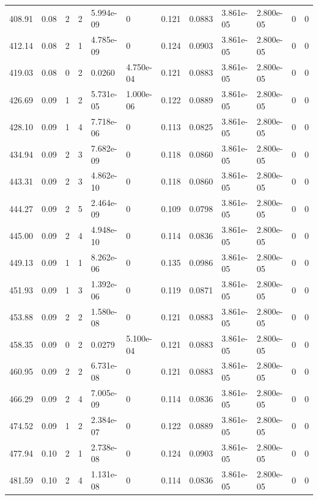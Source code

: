 \documentclass[preview]{standalone}
\begin{document}
{{{{\begin{tabular}{L{1.2cm}C{1.2cm} C{0.3cm}C{0.5cm} C{1.4cm}C{1.4cm} C{1.4cm}C{1.4cm} C{1.6cm}C{1.6cm} C{1.6cm}C{1.6cm}}
  408.91  &  0.08  & 2     &  2 &  5.994e-09  & 0  &  0.121&   0.0883& 3.861e-05 & 2.800e-05   &  0 & 0  \\ 
  412.14  &  0.08  & 2     &  1 &  4.785e-09  & 0  &  0.124&   0.0903& 3.861e-05 & 2.800e-05   &  0 & 0  \\ 
  419.03  &  0.08  & 0     &  2 &  0.0260  & 4.750e-04  &  0.121&   0.0883& 3.861e-05 & 2.800e-05   &  0 & 0  \\ 
  426.69  &  0.09  & 1     &  2 &  5.731e-05  & 1.000e-06  &  0.122&   0.0889& 3.861e-05 & 2.800e-05   &  0 & 0  \\ 
  428.10  &  0.09  & 1     &  4 &  7.718e-06  & 0  &  0.113&   0.0825& 3.861e-05 & 2.800e-05   &  0 & 0  \\ 
  434.94  &  0.09  & 2     &  3 &  7.682e-09  & 0  &  0.118&   0.0860& 3.861e-05 & 2.800e-05   &  0 & 0  \\ 
  443.31  &  0.09  & 2     &  3 &  4.862e-10  & 0  &  0.118&   0.0860& 3.861e-05 & 2.800e-05   &  0 & 0  \\ 
  444.27  &  0.09  & 2     &  5 &  2.464e-09  & 0  &  0.109&   0.0798& 3.861e-05 & 2.800e-05   &  0 & 0  \\ 
  445.00  &  0.09  & 2     &  4 &  4.948e-10  & 0  &  0.114&   0.0836& 3.861e-05 & 2.800e-05   &  0 & 0  \\ 
  449.13  &  0.09  & 1     &  1 &  8.262e-06  & 0  &  0.135&   0.0986& 3.861e-05 & 2.800e-05   &  0 & 0  \\ 
  451.93  &  0.09  & 1     &  3 &  1.392e-06  & 0  &  0.119&   0.0871& 3.861e-05 & 2.800e-05   &  0 & 0  \\ 
  453.88  &  0.09  & 2     &  2 &  1.580e-08  & 0  &  0.121&   0.0883& 3.861e-05 & 2.800e-05   &  0 & 0  \\ 
  458.35  &  0.09  & 0     &  2 &  0.0279  & 5.100e-04  &  0.121&   0.0883& 3.861e-05 & 2.800e-05   &  0 & 0  \\ 
  460.95  &  0.09  & 2     &  2 &  6.731e-08  & 0  &  0.121&   0.0883& 3.861e-05 & 2.800e-05   &  0 & 0  \\ 
  466.29  &  0.09  & 2     &  4 &  7.005e-09  & 0  &  0.114&   0.0836& 3.861e-05 & 2.800e-05   &  0 & 0  \\ 
  474.52  &  0.09  & 1     &  2 &  2.384e-07  & 0  &  0.122&   0.0889& 3.861e-05 & 2.800e-05   &  0 & 0  \\ 
  477.94  &  0.10  & 2     &  1 &  2.738e-08  & 0  &  0.124&   0.0903& 3.861e-05 & 2.800e-05   &  0 & 0  \\ 
  481.59  &  0.10  & 2     &  4 &  1.131e-08  & 0  &  0.114&   0.0836& 3.861e-05 & 2.800e-05   &  0 & 0  \\ 

\end{tabular}}}}}
\end{document}
